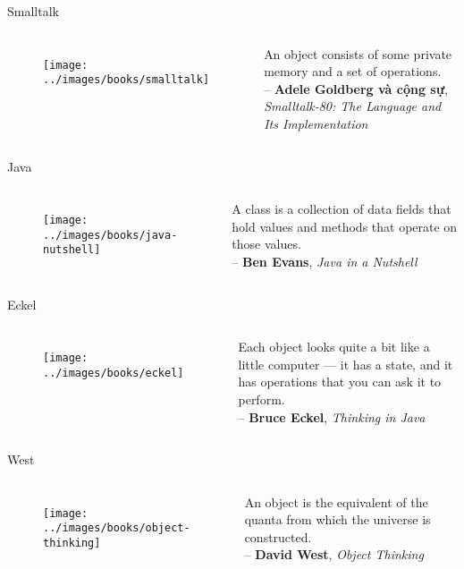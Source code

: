 \documentclass{beamer}
\begin{document}
\begin{frame}{Smalltalk}
    \begin{columns}
        \begin{figure}
            \centering
            \texttt{[image: ../images/books/smalltalk]}
        \end{figure}
        An object consists of some private memory and a set of
        operations.\\
        -- \textbf{Adele Goldberg và cộng sự}, \emph{Smalltalk-80: The Language and Its Implementation}
    \end{columns}
\end{frame}

\begin{frame}{Java}
    \begin{columns}
        \begin{figure}
            \centering
            \texttt{[image: ../images/books/java-nutshell]}
        \end{figure}
        A class is a collection of data fields that hold values and
        methods that operate on those values.\\
        -- \textbf{Ben Evans}, \emph{Java in a Nutshell}
    \end{columns}
\end{frame}

\begin{frame}{Eckel}
    \begin{columns}
        \begin{figure}
            \centering
            \texttt{[image: ../images/books/eckel]}
        \end{figure}
        Each object looks quite a bit like a little computer --- it
        has a state, and it has operations that you can ask it to
        perform.\\
        -- \textbf{Bruce Eckel}, \emph{Thinking in Java}
    \end{columns}
\end{frame}

\begin{frame}{West}
    \begin{columns}
        \begin{figure}
            \centering
            \texttt{[image: ../images/books/object-thinking]}
        \end{figure}
        An object is the equivalent of the quanta from which
        the universe is constructed.\\
        -- \textbf{David West}, \emph{Object Thinking}
    \end{columns}
\end{frame}
\end{document}
